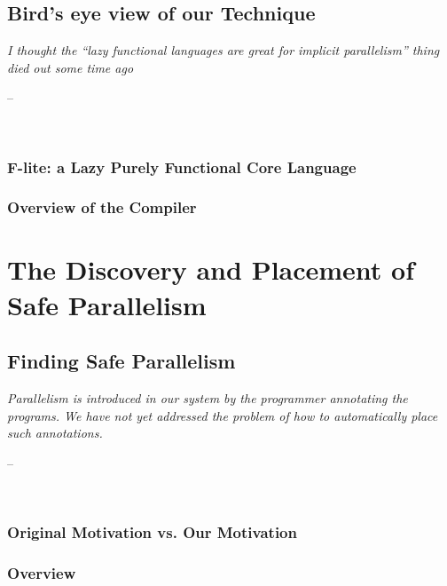 \documentclass[openright, dottedtoc, headinclude, footinclude=true, a4paper, numbers=noenddot]{scrreprt}
\makeatletter
\newenvironment{chapquote}[2][2em]
  {\setlength{\@tempdima}{#1}%
   \def\chapquote@author{#2}%
   \parshape 1 \@tempdima \dimexpr\textwidth-2\@tempdima\relax%
   \itshape}
  {\par\normalfont\hfill--\ \chapquote@author\hspace*{\@tempdima}\par\noindent\hrulefill\\[1cm]}
\makeatother
\begin{document}
    \chapter{Bird's eye view of our Technique}
    \label{chap:overview}
    \begin{chapquote}{\cite{benEmail}}
    I thought the ``lazy functional languages are great for implicit
    parallelism'' thing died out some time ago
    \end{chapquote}
    

        \section{F-lite: a Lazy Purely Functional Core Language}
        \label{sec:Flite}
        
        
        \section{Overview of the Compiler}
        \label{sec:overview}
        

\part{The Discovery and Placement of Safe Parallelism}
\label{part:static}

    \chapter{Finding Safe Parallelism}
    \label{chap:discovery} 
    \begin{chapquote}{\cite{vGMachine}}
    Parallelism is introduced in our system by the programmer annotating the
    programs. We have not yet addressed the problem of how to automatically
    place such annotations.
    \end{chapquote}
    

        \section{Original Motivation vs. Our Motivation}
        
    
        \section{Overview}
        \label{sec:strictnessOverview}
        
    
\end{document}
